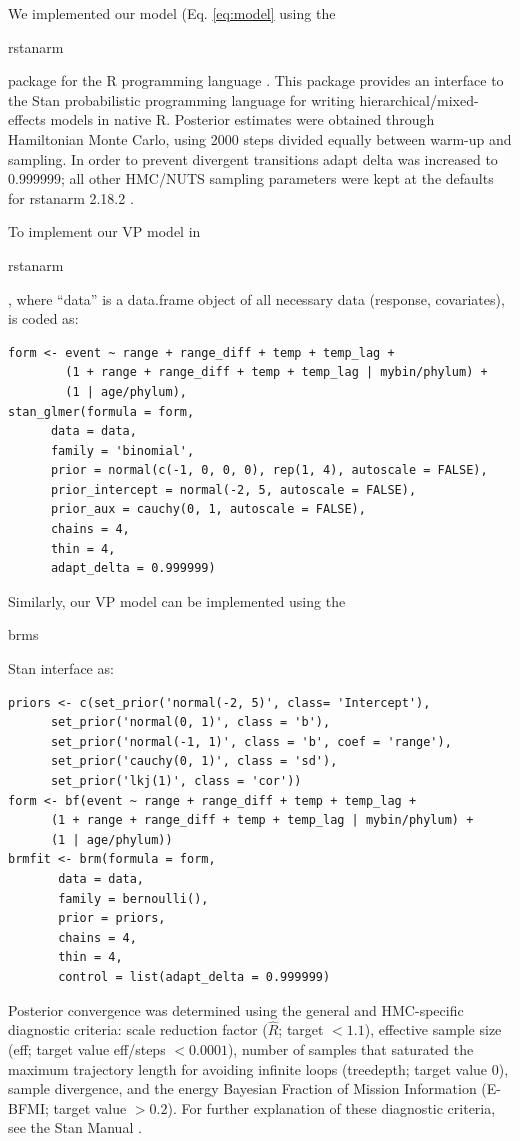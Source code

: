 \documentclass[12pt,letterpaper]{article}
\begin{document}
\begin{refsection}
We implemented our model (Eq. \ref{eq:model} using the \begin{texttt}rstanarm\end{texttt} package for the R programming language \citep{StanManual}. This package provides an interface to the Stan probabilistic programming language for writing hierarchical/mixed-effects models in native R. Posterior estimates were obtained through Hamiltonian Monte Carlo, using 2000 steps divided equally between warm-up and sampling. In order to prevent divergent transitions adapt delta was increased to 0.999999; all other HMC/NUTS sampling parameters were kept at the defaults for rstanarm 2.18.2 \citep{rstanarm}.

To implement our VP model in \begin{texttt}rstanarm\end{texttt}, where ``data'' is a data.frame object of all necessary data (response, covariates), is coded as:
\begin{verbatim}
form <- event ~ range + range_diff + temp + temp_lag + 
        (1 + range + range_diff + temp + temp_lag | mybin/phylum) + 
        (1 | age/phylum), 
stan_glmer(formula = form,
      data = data, 
      family = 'binomial',
      prior = normal(c(-1, 0, 0, 0), rep(1, 4), autoscale = FALSE), 
      prior_intercept = normal(-2, 5, autoscale = FALSE), 
      prior_aux = cauchy(0, 1, autoscale = FALSE), 
      chains = 4,
      thin = 4,
      adapt_delta = 0.999999)
\end{verbatim}

Similarly, our VP model can be implemented using the \begin{texttt}brms\end{texttt} Stan interface \citep{brms2017,brms2018} as:
\begin{verbatim}
priors <- c(set_prior('normal(-2, 5)', class= 'Intercept'),
      set_prior('normal(0, 1)', class = 'b'),
      set_prior('normal(-1, 1)', class = 'b', coef = 'range'),
      set_prior('cauchy(0, 1)', class = 'sd'),
      set_prior('lkj(1)', class = 'cor'))
form <- bf(event ~ range + range_diff + temp + temp_lag +
      (1 + range + range_diff + temp + temp_lag | mybin/phylum) +
      (1 | age/phylum))
brmfit <- brm(formula = form,
       data = data, 
       family = bernoulli(), 
       prior = priors,
       chains = 4, 
       thin = 4,
       control = list(adapt_delta = 0.999999)
\end{verbatim}

Posterior convergence was determined using the general and HMC-specific diagnostic criteria: scale reduction factor (\(\hat{R}\); target \(<1.1\)), effective sample size (eff; target value eff/steps \(<0.0001\)), number of samples that saturated the maximum trajectory length for avoiding infinite loops (treedepth; target value 0), sample divergence, and the energy Bayesian Fraction of Mission Information (E-BFMI; target value \(>0.2\)). For further explanation of these diagnostic criteria, see the Stan Manual \citep{StanManual}.


\printbibliography[title={Supplementary References}]
\end{refsection}
\end{document}
